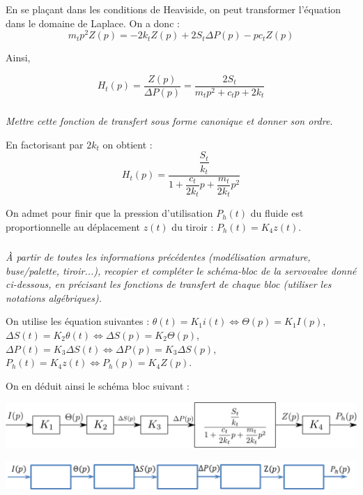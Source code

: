 \documentclass[10pt,fleqn]{article} %
\begin{document}
\begin{multicols}{2}
\begin{corrige}
En se plaçant dans les conditions de Heaviside, on peut transformer l'équation
dans le domaine de Laplace. On a donc : 
$$
m_t p^2 Z(p) = -2k_t Z(p) + 2 S_t \Delta P(p) - pc_t Z(p)
$$

Ainsi, 

$$
H_t(p)=\dfrac{Z(p)}{\Delta P(p)} = \dfrac{2S_t}{m_tp^2+c_tp+2k_t}
$$
\end{corrige}
\else
\fi

\subparagraph{}
\textit{Mettre cette fonction de transfert sous forme canonique et donner son ordre.}

\ifprof
\begin{corrige}

En factorisant par $2k_t$ on obtient : 
$$
H_t(p)= \dfrac{\dfrac{S_t}{k_t}}{1+\dfrac{c_t}{2k_t}p+\dfrac{m_t}{2k_t}p^2}
$$

\end{corrige}
\else
\fi
On admet pour finir que la pression d'utilisation $P_h(t)$ du fluide est proportionnelle au déplacement $z(t)$ du tiroir : $P_h(t) =K_4 z(t)$.

\subparagraph{}
\textit{\`A partir de toutes les informations précédentes (modélisation armature, buse/palette,
tiroir...), recopier et compléter le schéma-bloc de la servovalve donné ci-dessous, en précisant les
fonctions de transfert de chaque bloc (utiliser les notations algébriques).}

\ifprof
\begin{corrige}
On utilise les équation suivantes : 
$\theta(t)=K_1 i(t) \Leftrightarrow \Theta(p)=K_1 I(p)$, 
$\Delta S(t) = K_2 \theta (t) \Leftrightarrow  \Delta S(p) = K_2 \Theta (p)$,
$\Delta P(t) = K_3 \Delta S(t) \Leftrightarrow  \Delta P(p) = K_3 \Delta S(p)$,
$P_h(t)=K_4 z(t) \Leftrightarrow   P_h(p)=K_4 Z(p)$.

On en déduit ainsi le schéma bloc suivant :
\begin{center}
 \includegraphics[width=.8\linewidth]{images/blocs2}
\end{center}
\end{corrige}
\else
\begin{center}
\includegraphics[width=.95\linewidth]{images/schema_bloc_vierge.png}
\end{center}
\fi




\end{multicols}
\end{document}
